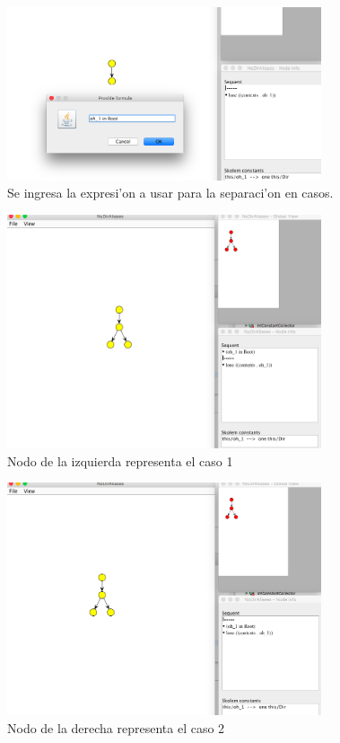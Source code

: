 \begin{figure}[H]
	\includegraphics[width=350px]{img/ejemplo/6.png}
	\centering
	\caption{Se ingresa la expresi'on a usar para la separaci'on en casos.}
\end{figure}

\begin{figure}[H]
	\includegraphics[width=350px]{img/ejemplo/7.png}
	\centering
	\caption{Nodo de la izquierda representa el caso 1}
\end{figure}

\begin{figure}[H]
	\includegraphics[width=350px]{img/ejemplo/8.png}
	\centering
	\caption{Nodo de la derecha representa el caso 2}
\end{figure}

